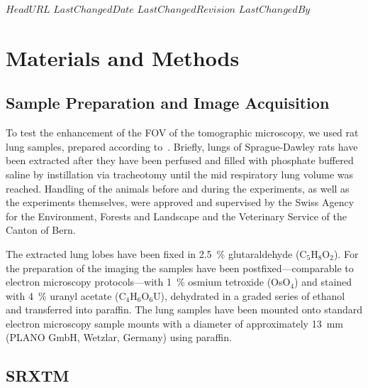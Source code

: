 \svnidlong
{$HeadURL$}
{$LastChangedDate$}
{$LastChangedRevision$}
{$LastChangedBy$}

\ifhtml
\else
\begin{center}
\end{center}
\fi

\section{Materials and Methods}
\label{sec:materials and methods}

\cbstart
\subsection{Sample Preparation and Image Acquisition}

To test the enhancement of the FOV of the tomographic microscopy, we used rat lung samples, prepared according to~\citet{Schittny1997}\cite{Schittny1998}. Briefly, lungs of Sprague-Dawley rats have been extracted after they have been perfused and filled with phosphate buffered saline by instillation via tracheotomy until the mid respiratory lung volume was reached. Handling of the animals before and during the experiments, as well as the experiments themselves, were approved and supervised by the Swiss Agency for the Environment, Forests and Landscape and the Veterinary Service of the Canton of Bern.

The extracted lung lobes have been fixed in \SI{2.5}{\percent} glutaraldehyde (C$_5$H$_8$O$_2$). For the preparation of the imaging the samples have been postfixed---comparable to electron microscopy protocols---with \SI{1}{\percent} osmium tetroxide (OsO$_4$) and stained with \SI{4}{\percent} uranyl acetate (C$_4$H$_6$O$_6$U), dehydrated in a graded series of ethanol and transferred into paraffin. The lung samples have been mounted onto standard electron microscopy sample mounts with a diameter of approximately \SI{13}{\milli\meter} (PLANO GmbH, Wetzlar, Germany) using paraffin.
\cbend

\subsection{SRXTM}

